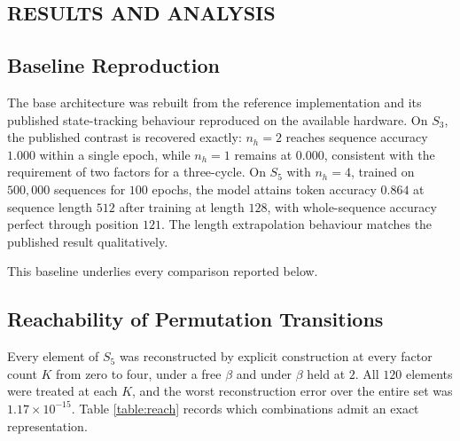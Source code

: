 \begin{center}
	\chapter{RESULTS AND ANALYSIS}
\end{center}
\justifying

\section{Baseline Reproduction}

The base architecture was rebuilt from the reference implementation and its
published state-tracking behaviour reproduced on the available hardware. On
$S_3$, the published contrast is recovered exactly: $n_h = 2$ reaches sequence
accuracy $1.000$ within a single epoch, while $n_h = 1$ remains at $0.000$,
consistent with the requirement of two factors for a three-cycle. On $S_5$ with
$n_h = 4$, trained on $500{,}000$ sequences for $100$ epochs, the model attains
token accuracy $0.864$ at sequence length $512$ after training at length $128$,
with whole-sequence accuracy perfect through position $121$. The length
extrapolation behaviour matches the published result qualitatively.

This baseline underlies every comparison reported below.

\section{Reachability of Permutation Transitions}

Every element of $S_5$ was reconstructed by explicit construction at every factor
count $K$ from zero to four, under a free $\beta$ and under $\beta$ held at $2$.
All $120$ elements were treated at each $K$, and the worst reconstruction error
over the entire set was $1.17 \times 10^{-15}$. Table \ref{table:reach} records
which combinations admit an exact representation.

